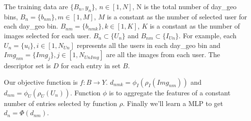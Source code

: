 \documentclass{article}
\begin{document}
The training data are $\{B_n, y_n\}$, $n\in[1,N]$, N is the total number of day\_geo bins, $B_n=\{b_{nm}\}, m\in[1,M]$, $M$ is a constant as the number of selected user for each day\_geo bin. 
$B_{nm}=\{b_{nmk}\}, k\in[1,K]$, $K$ is a constant as the number of images selected for each user. 
$B_n\subset\{U_n\}$ and 
$B_{nm}\subset\{I_{Un}\}$.
For example, each $U_n=\{u_i\}, i\in[1,N_{Un}]$ represents all the users in each day\_geo bin and $Img_{nm}=\{Img_j\}, j\in[1,N_{UnImg}]$ are all the images from each user.
The descriptor set is $D$ for each entry in set $B$.

Our objective function is $f: B\to Y$. $d_{nmk} = \phi_I(\rho_I(Img_{nm}))$ and $d_{nm} = \phi_U(\rho_U(U_n))$. 
Function $\phi$ is to aggregate the features of a constant number of entries selected by function $\rho$. Finally we'll learn a MLP to get $d_n = \Phi(d_{nm})$.
\end{document}
